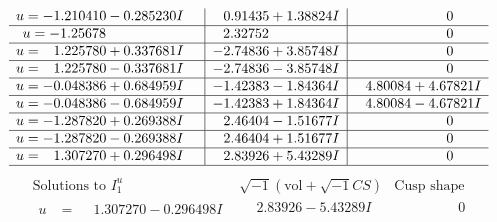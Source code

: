 \documentclass[1p]{elsarticle_modified}
\theoremstyle{definition}
\newcommand{\I}{\sqrt{-1}}
\begin{document}
$$\begin{array}{c|c|c}
\begin{aligned}
u &= -1.210410 - 0.285230 I\end{aligned}
 & \phantom{-}0.91435 + 1.38824 I & \phantom{-0.000000 } 0 \\ \hline\begin{aligned}
u &= -1.25678\phantom{ +0.000000I}\end{aligned}
 & \phantom{-}2.32752\phantom{ +0.000000I} & \phantom{-0.000000 } 0 \\ \hline\begin{aligned}
u &= \phantom{-}1.225780 + 0.337681 I\end{aligned}
 & -2.74836 + 3.85748 I & \phantom{-0.000000 } 0 \\ \hline\begin{aligned}
u &= \phantom{-}1.225780 - 0.337681 I\end{aligned}
 & -2.74836 - 3.85748 I & \phantom{-0.000000 } 0 \\ \hline\begin{aligned}
u &= -0.048386 + 0.684959 I\end{aligned}
 & -1.42383 - 1.84364 I & \phantom{-}4.80084 + 4.67821 I \\ \hline\begin{aligned}
u &= -0.048386 - 0.684959 I\end{aligned}
 & -1.42383 + 1.84364 I & \phantom{-}4.80084 - 4.67821 I \\ \hline\begin{aligned}
u &= -1.287820 + 0.269388 I\end{aligned}
 & \phantom{-}2.46404 - 1.51677 I & \phantom{-0.000000 } 0 \\ \hline\begin{aligned}
u &= -1.287820 - 0.269388 I\end{aligned}
 & \phantom{-}2.46404 + 1.51677 I & \phantom{-0.000000 } 0 \\ \hline\begin{aligned}
u &= \phantom{-}1.307270 + 0.296498 I\end{aligned}
 & \phantom{-}2.83926 + 5.43289 I & \phantom{-0.000000 } 0\\
 \hline 
 \end{array}$$\newpage$$\begin{array}{c|c|c}  
\text{Solutions to }I^u_{1}& \I (\text{vol} + \sqrt{-1}CS) & \text{Cusp shape}\\
 \hline 
\begin{aligned}
u &= \phantom{-}1.307270 - 0.296498 I\end{aligned}
 & \phantom{-}2.83926 - 5.43289 I & \phantom{-0.000000 } 0 \\ \hline\begin{aligned}

\end{aligned}
\end{array}$$
\end{document}
